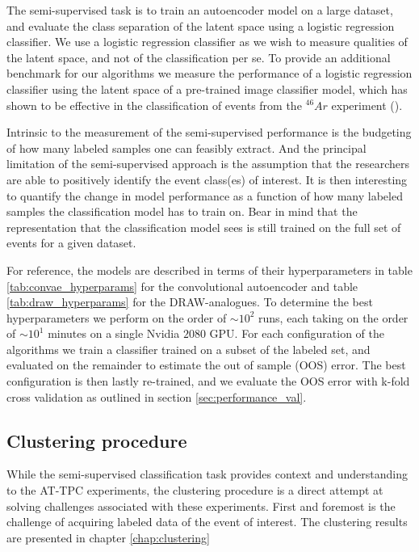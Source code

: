 The semi-supervised task is to train an autoencoder model on a large dataset, and evaluate the class separation of the latent space using a logistic regression classifier. We use a logistic regression classifier as we wish to measure qualities of the latent space, and not of the classification per se. To provide an additional benchmark for our algorithms we measure the performance of a logistic regression classifier using the latent space of a pre-trained image classifier model, which has shown to be effective in the classification of events from the ${}^{46}Ar$ experiment (\cite{Kuchera2019}).

Intrinsic to the measurement of the semi-supervised performance is the budgeting of how many labeled samples one can feasibly extract. And the principal limitation of the semi-supervised approach is the assumption that the researchers are able to positively identify the event class(es) of interest. It is then interesting to quantify the change in model performance as a function of how many labeled samples the classification model has to train on. Bear in mind that the representation that the classification model sees is still trained on the full set of events for a given dataset. 

For reference, the models are described in terms of their hyperparameters in table \ref{tab:convae_hyperparams} for the convolutional autoencoder and table \ref{tab:draw_hyperparams} for the DRAW-analogues. To determine the best hyperparameters we perform on the order of $\sim 10^2$ runs, each taking on the order of $\sim 10^1$ minutes on a single Nvidia $2080$ GPU. For each configuration of the algorithms we train a classifier trained on a subset of the labeled set, and evaluated on the remainder to estimate the out of sample (OOS) error. The best configuration is then lastly re-trained, and we evaluate the OOS error with k-fold cross validation as outlined in section \ref{sec:performance_val}.

\subsection{Clustering procedure}

While the semi-supervised classification task provides context and understanding to the AT-TPC experiments, the clustering procedure is a direct attempt at solving challenges associated with these experiments. First and foremost is the challenge of acquiring labeled data of the event of interest. The clustering results are presented in chapter \ref{chap:clustering} 

